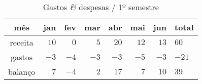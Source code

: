 \begin{table}\centering
  \caption{Gastos {\it \&} despesas / 1º semestre}

  \begin{tabular}{crrrrrrl}
    mês & jan & fev & mar & abr & mai & jun & total\\
    \hline
  receita & $10$ & $0$ & $5$ & $20$ & $12$ & $13$ & $60$\\
  gastos  & $-3$ & $-4$ & $-3$ & $-3$ & $-5$ & $-3$ & $-21$ \\
  \hline
  balanço & $7$ & $-4$ & $2$ & $17$ & $7$ & $10$ & $39$\\
  \end{tabular}
\end{table}
